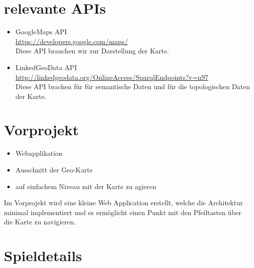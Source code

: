 \documentclass{article}
\begin{document}
\section{relevante APIs}
\begin{itemize}
\item GoogleMaps API \\
	\url{https://developers.google.com/maps/} \\
	Diese API brauchen wir zur Darstellung der Karte.
\item LinkedGeoData API \\
	\url{http://linkedgeodata.org/OnlineAccess/SparqlEndpoints?v=n97} \\
	Diese API brachen für für semantische Daten und für die topologischen Daten der Karte.

\end{itemize}

\section{Vorprojekt}
\begin{itemize}
\item Webapplikation
\item Ausschnitt der Geo-Karte
\item auf einfachem Niveau mit der Karte zu agieren
\end{itemize}

Im Vorprojekt wird eine kleine Web Application erstellt, welche die Architektur minimal implementiert und es ermöglicht einen Punkt mit den Pfeiltasten über die Karte zu navigieren.

\section{Spieldetails}
\end{document}
